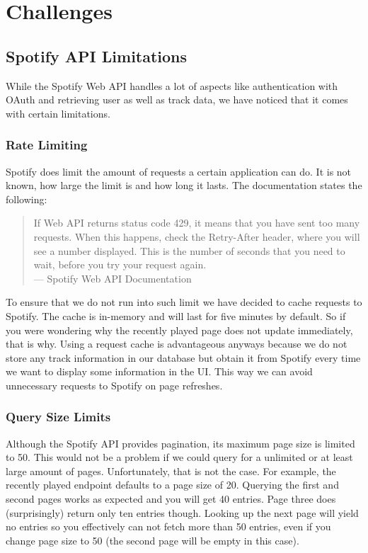 \chapter{Challenges}
\label{ch:Challenges}

\section{Spotify API Limitations}

While the Spotify Web API handles a lot of aspects like authentication with OAuth and retrieving user as well as track data, we have noticed that it comes with certain limitations.

\subsection{Rate Limiting}

Spotify does limit the amount of requests a certain application can do. It is not known, how large the limit is and how long it lasts. The documentation states the following:

\begin{quote}
    If Web API returns status code 429, it means that you have sent too many requests. When this happens, check the Retry-After header, where you will see a number displayed. This is the number of seconds that you need to wait, before you try your request again. \\
    --- Spotify Web API Documentation \cite{SpotifyWebApi}
\end{quote}

To ensure that we do not run into such limit we have decided to cache requests to Spotify. The cache is in-memory and will last for five minutes by default. So if you were wondering why the recently played page does not update immediately, that is why. Using a request cache is advantageous anyways because we do not store any track information in our database but obtain it from Spotify every time we want to display some information in the \ac{UI}. This way we can avoid unnecessary requests to Spotify on page refreshes.

\subsection{Query Size Limits}

Although the Spotify API provides pagination, its maximum page size is limited to 50. This would not be a problem if we could query for a unlimited or at least large amount of pages. Unfortunately, that is not the case. For example, the recently played endpoint defaults to a page size of 20. Querying the first and second pages works as expected and you will get 40 entries. Page three does (surprisingly) return only ten entries though. Looking up the next page will yield no entries so you effectively can not fetch more than 50 entries, even if you change page size to 50 (the second page will be empty in this case).


